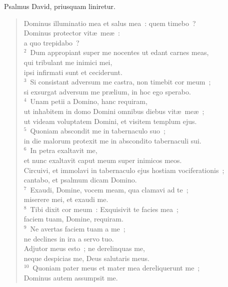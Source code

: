 \bchapter
\lettrine[lines=3,image=true,loversize=0.05,lraise=-0.03]{P}{}salmus David, priusquam liniretur. \begin{flushleft}\begin{verse}\vspace{6pt}Dominus illuminatio mea et salus mea~: quem timebo~?\\ Dominus protector vit\ae\ me\ae~:\\ a quo trepidabo~?\\
${}^{2}$~Dum appropiant super me nocentes ut edant carnes meas,\\ qui tribulant me inimici mei,\\ ipsi infirmati sunt et ceciderunt.\\
${}^{3}$~Si consistant adversum me castra, non timebit cor meum~;\\ si exsurgat adversum me pr\ae lium, in hoc ego sperabo.\\
${}^{4}$~Unam petii a Domino, hanc requiram,\\ ut inhabitem in domo Domini omnibus diebus vit\ae\ me\ae~;\\ ut videam voluptatem Domini, et visitem templum ejus.\\
${}^{5}$~Quoniam abscondit me in tabernaculo suo~;\\ in die malorum protexit me in abscondito tabernaculi sui.\\
${}^{6}$~In petra exaltavit me,\\ et nunc exaltavit caput meum super inimicos meos.\\ Circuivi, et immolavi in tabernaculo ejus hostiam vociferationis~;\\ cantabo, et psalmum dicam Domino.\\
${}^{7}$~Exaudi, Domine, vocem meam, qua clamavi ad te~;\\ miserere mei, et exaudi me.\\
${}^{8}$~Tibi dixit cor meum~: Exquisivit te facies mea~;\\ faciem tuam, Domine, requiram.\\
${}^{9}$~Ne avertas faciem tuam a me~;\\ ne declines in ira a servo tuo.\\ Adjutor meus esto~; ne derelinquas me,\\ neque despicias me, Deus salutaris meus.\\
${}^{10}$~Quoniam pater meus et mater mea dereliquerunt me~;\\ Dominus autem assumpsit me.\\

\end{verse}
\end{flushleft}
